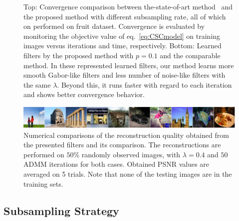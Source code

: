 \begin{figure}[h]
\caption{Top: Convergence comparison between the-state-of-art method~\cite{heide2015fast} and the proposed method with different subsampling rate, all of which on performed on fruit dataset. Convergence is evaluated by monitoring the objective value of eq.~\ref{eq:CSCmodel} on training images versus iterations and time, respectively. Bottom: Learned filters by the proposed method with $p=0.1$ and the comparable method. In these represented learned filters, our method learns more smooth Gabor-like filters and less number of noise-like filters with the same $\lambda$. Beyond this, it runs faster with regard to each iteration and shows better convergence behavior.}
\label{fig:subsampleResult}
\end{figure}

\begin{figure}[h]
    \centering
    \includegraphics[width=1\textwidth]{figure/reconImage.pdf}
    \caption{Numerical comparisons of the reconstruction quality obtained from the presented filters and its comparison. The reconstructions are performed on $50\%$ randomly observed images, with $\lambda = 0.4$ and $50$ ADMM iterations for both cases. Obtained PSNR values are averaged on 5 trials. Note that none of the testing images are in the training sets.} \label{fig:PSNRrecon}
\end{figure}

\subsection{Subsampling Strategy}

